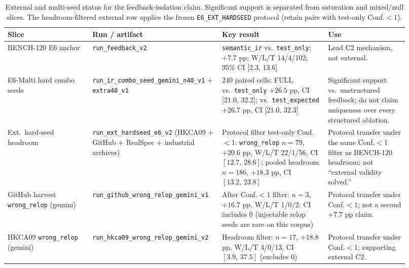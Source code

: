 \begin{table}[t]
  \centering
  \caption{External and multi-seed status for the feedback-isolation claim.
  Significant support is separated from saturation and mixed/null slices.
  The headroom-filtered external row applies the frozen
  \texttt{E6\_EXT\_HARDSEED} protocol (retain pairs with test-only Conf.${<}1$).}
  \label{tab:e6-ext-multi-status}
  \footnotesize
  \begin{tabular}{@{}p{0.20\linewidth}p{0.28\linewidth}p{0.25\linewidth}p{0.19\linewidth}@{}}
    \toprule
    \textbf{Slice} & \textbf{Run / artifact} & \textbf{Key result} & \textbf{Use} \\
    \midrule
    BENCH-120 E6 anchor
      & \texttt{run\_feedback\_v2}
      & \texttt{semantic\_ir} vs.\ \texttt{test\_only}: ${+}7.7$ pp;
        W/L/T 14/4/102; 95\% CI [2.3, 13.6]
      & Lead C2 mechanism, not external. \\
    E6-Multi hard combo seeds
      & \texttt{run\_ir\_combo\_seed\_gemini\_n40\_v1} + \texttt{extra40\_v1}
      & 240 paired cells: FULL vs.\ \texttt{test\_only} ${+}26.5$ pp,
        CI [21.0, 32.2]; vs.\ \texttt{test\_expected} ${+}26.7$ pp,
        CI [21.0, 32.3]
      & Significant support vs.\ unstructured feedback; do not claim uniqueness
        over every structured ablation. \\
    Ext.\ hard-seed headroom
      & \texttt{run\_ext\_hardseed\_e6\_v2}
        (HKCA09 + GitHub + RealSpec + industrial archives)
      & Protocol filter test-only Conf.${<}1$:
        \texttt{wrong\_relop} $n{=}79$, ${+}20.6$ pp, W/L/T 22/1/56,
        CI $[12.7,\,28.6]$; pooled headroom $n{=}186$, ${+}18.3$ pp,
        CI $[13.2,\,23.8]$
      & Protocol transfer under the same Conf.${<}1$ filter as BENCH-120
        headroom; not ``external validity solved.'' \\
    GitHub harvest \texttt{wrong\_relop} (gemini)
      & \texttt{run\_github\_wrong\_relop\_gemini\_v1}
      & After Conf.${<}1$ filter: $n{=}3$, ${+}16.7$ pp, W/L/T 1/0/2;
        CI includes 0 (injectable relop seeds are rare on this corpus)
      & Protocol transfer under Conf.${<}1$; not a second ${+}7.7$ pp claim. \\
    HKCA09 \texttt{wrong\_relop} (gemini)
      & \texttt{run\_hkca09\_wrong\_relop\_gemini\_v2}
      & Headroom filter: $n{=}17$, ${+}18.8$ pp, W/L/T 4/0/13,
        CI $[3.9,\,37.5]$ (excludes 0)
      & Protocol transfer under Conf.${<}1$; supporting external C2. \\

\end{tabular}
\end{table}
